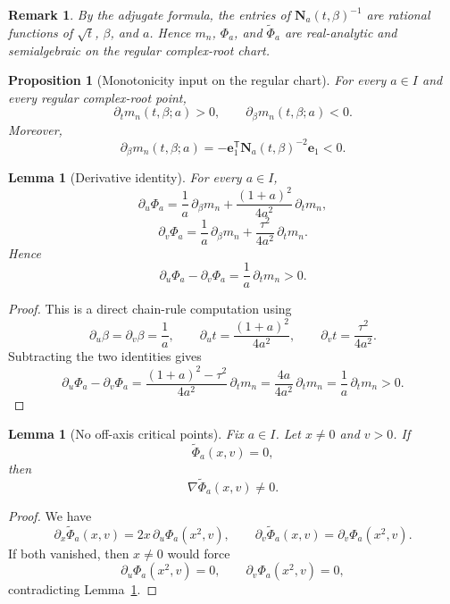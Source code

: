 \documentclass[11pt]{article}
\newtheorem{lemma}[theorem]{Lemma}
\newtheorem{proposition}[theorem]{Proposition}
\newtheorem{remark}[theorem]{Remark}
\begin{document}
\begin{remark}\label{rem:rational}
By the adjugate formula, the entries of \(\mathbf N_a(t,\beta)^{-1}\) are rational functions of \(\sqrt t\), \(\beta\), and \(a\). Hence \(m_n\), \(\Phi_a\), and \(\widetilde\Phi_a\) are real-analytic and semialgebraic on the regular complex-root chart.
\end{remark}

\begin{proposition}[Monotonicity input on the regular chart]\label{prop:monotone-m}
For every \(a\in I\) and every regular complex-root point,
\[
\partial_t m_n(t,\beta;a)>0,
\qquad
\partial_\beta m_n(t,\beta;a)<0.
\]
Moreover,
\[
\partial_\beta m_n(t,\beta;a)
=
-\mathbf e_1^{\mathsf T}\mathbf N_a(t,\beta)^{-2}\mathbf e_1<0.
\]
\end{proposition}

\begin{lemma}[Derivative identity]\label{lem:derivative-identity}
For every \(a\in I\),
\[
\partial_u\Phi_a
=
\frac1a\,\partial_\beta m_n
+
\frac{(1+a)^2}{4a^2}\,\partial_t m_n,
\]
\[
\partial_v\Phi_a
=
\frac1a\,\partial_\beta m_n
+
\frac{\tau^2}{4a^2}\,\partial_t m_n.
\]
Hence
\[
\partial_u\Phi_a-\partial_v\Phi_a
=
\frac1a\,\partial_t m_n
>0.
\]
\end{lemma}

\begin{proof}
This is a direct chain-rule computation using
\[
\partial_u\beta=\partial_v\beta=\frac1a,
\qquad
\partial_u t=\frac{(1+a)^2}{4a^2},
\qquad
\partial_v t=\frac{\tau^2}{4a^2}.
\]
Subtracting the two identities gives
\[
\partial_u\Phi_a-\partial_v\Phi_a
=
\frac{(1+a)^2-\tau^2}{4a^2}\,\partial_t m_n
=
\frac{4a}{4a^2}\,\partial_t m_n
=
\frac1a\,\partial_t m_n>0.
\]
\end{proof}

\begin{lemma}[No off-axis critical points]\label{lem:no-off-axis-critical}
Fix \(a\in I\). Let \(x\neq 0\) and \(v>0\). If
\[
\widetilde\Phi_a(x,v)=0,
\]
then
\[
\nabla \widetilde\Phi_a(x,v)\neq 0.
\]
\end{lemma}

\begin{proof}
We have
\[
\partial_x\widetilde\Phi_a(x,v)=2x\,\partial_u\Phi_a(x^2,v),
\qquad
\partial_v\widetilde\Phi_a(x,v)=\partial_v\Phi_a(x^2,v).
\]
If both vanished, then \(x\neq 0\) would force
\[
\partial_u\Phi_a(x^2,v)=0,
\qquad
\partial_v\Phi_a(x^2,v)=0,
\]
contradicting Lemma~\ref{lem:derivative-identity}.
\end{proof}
\end{document}
